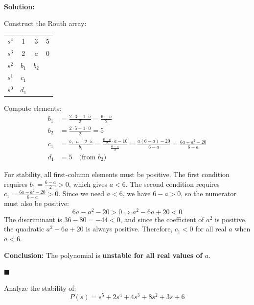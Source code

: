 \textbf{Solution:}

Construct the Routh array:
\begin{center}
\begin{tabular}{c|ccc}
\toprule
$s^4$ & 1 & 3 & 5 \\
$s^3$ & 2 & $a$ & 0 \\
$s^2$ & $b_1$ & $b_2$ & \\
$s^1$ & $c_1$ & & \\
$s^0$ & $d_1$ & & \\
\bottomrule
\end{tabular}
\end{center}

Compute elements:
\begin{align*}
b_1 &= \frac{2 \cdot 3 - 1 \cdot a}{2} = \frac{6-a}{2} \\
b_2 &= \frac{2 \cdot 5 - 1 \cdot 0}{2} = 5 \\
c_1 &= \frac{b_1 \cdot a - 2 \cdot 5}{b_1} = \frac{\frac{6-a}{2} \cdot a - 10}{\frac{6-a}{2}} = \frac{a(6-a) - 20}{6-a} = \frac{6a - a^2 - 20}{6-a} \\
d_1 &= 5 \quad \text{(from } b_2\text{)}
\end{align*}

For stability, all first-column elements must be positive. The first condition requires $b_1 = \frac{6-a}{2} > 0$, which gives $a < 6$. The second condition requires $c_1 = \frac{6a - a^2 - 20}{6-a} > 0$. Since we need $a < 6$, we have $6 - a > 0$, so the numerator must also be positive:
\begin{equation*}
6a - a^2 - 20 > 0 \Rightarrow a^2 - 6a + 20 < 0
\end{equation*}
The discriminant is $36 - 80 = -44 < 0$, and since the coefficient of $a^2$ is positive, the quadratic $a^2 - 6a + 20$ is always positive. Therefore, $c_1 < 0$ for all real $a$ when $a < 6$.

\textbf{Conclusion:} The polynomial is \textbf{unstable for all real values of $a$}.

\hfill $\blacksquare$

\vspace{1em}

\begin{example}
\label{ex:row_zeros}
Analyze the stability of:
\begin{equation*}
P(s) = s^5 + 2s^4 + 4s^3 + 8s^2 + 3s + 6
\end{equation*}
\end{example}

